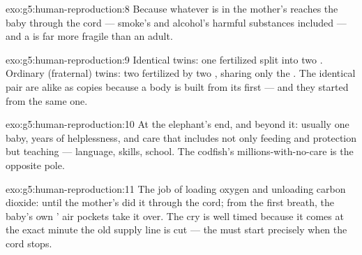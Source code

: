 \begin{solution}{exo:g5:human-reproduction:8}
Because whatever is in the mother's  reaches the baby
through the cord --- smoke's and alcohol's harmful substances
included --- and a  is far more fragile than an adult.
\end{solution}

\begin{solution}{exo:g5:human-reproduction:9}
Identical twins: one fertilized  split into two
. Ordinary (fraternal) twins: two  fertilized
by two , sharing only the . The identical pair
are alike as copies because a body is built from its first
 --- and they started from the same one.
\end{solution}

\begin{solution}{exo:g5:human-reproduction:10}
At the elephant's end, and beyond it: usually one baby, years
of helplessness, and care that includes not only feeding and
protection but teaching --- language, skills, school. The
codfish's millions-with-no-care is the opposite pole.
\end{solution}

\begin{solution}{exo:g5:human-reproduction:11}
The job of loading oxygen and unloading carbon dioxide: until
 the mother's  did it through the cord; from the
first breath, the baby's own ' air pockets take it over.
The cry is well timed because it comes at the exact minute
the old supply line is cut --- the  must start precisely
when the cord stops.
\end{solution}
